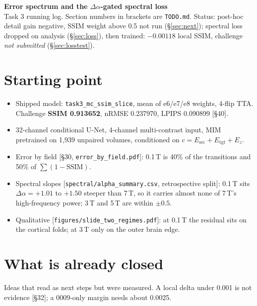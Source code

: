 \documentclass[10pt,a4paper]{article}
\newcommand{\pending}[1][pending]{\textcolor{live}{\textit{#1}}}
\newcommand{\da}{\Delta\alpha}
\begin{document}
\sloppy

{\Large\bfseries Error spectrum and the $\Delta\alpha$-gated spectral loss}\\[1mm]
{\small Task 3 running log. Section numbers in brackets are \texttt{TODO.md}.
Status: post-hoc detail gain negative, SSIM weight above 0.5 not run (\S\ref{sec:next});
spectral loss dropped on analysis (\S\ref{sec:loss}), then trained: $-0.00118$ local SSIM,
challenge \pending[not submitted] (\S\ref{sec:losstest}).}

\section{Starting point}\label{sec:start}

\begin{itemize}
  \item Shipped model: \texttt{task3\_mc\_ssim\_slice}, mean of e6/e7/e8 weights, 4-flip TTA.
        Challenge \textbf{SSIM 0.913652}, nRMSE 0.237970, LPIPS 0.090899 [\S40].
  \item 32-channel conditional U-Net, 4-channel multi-contrast input, MIM pretrained on 1{,}939
        unpaired volumes, conditioned on $c = E_{\mathrm{src}} + E_{\mathrm{tgt}} + E_z$.
  \item Error by field [\S30, \texttt{error\_by\_field.pdf}]: 0.1\,T is 40\% of the
        transitions and 50\% of $\sum(1-\mathrm{SSIM})$.
  \item Spectral slopes [\texttt{spectral/alpha\_summary.csv}, retrospective split]:
        0.1\,T sits $\da = +1.01$ to $+1.50$ steeper than 7\,T, so it carries almost none of
        7\,T's high-frequency power; 3\,T and 5\,T are within $\pm 0.5$.
  \item Qualitative [\texttt{figures/slide\_two\_regimes.pdf}]: at 0.1\,T the residual sits on
        the cortical folds; at 3\,T only on the outer brain edge.
\end{itemize}

\section{What is already closed}\label{sec:closed}

Ideas that read as next steps but were measured. A local delta under 0.001 is not evidence
[\S32]; a 0009-only margin needs about 0.0025.
\end{document}
